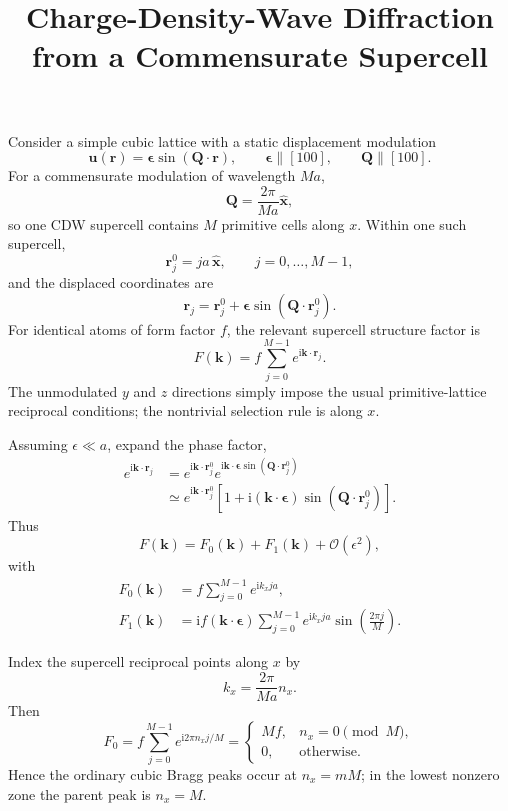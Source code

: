 \documentclass[11pt]{article}
\title{\vspace{-1.2cm}Charge-Density-Wave Diffraction from a Commensurate Supercell}
\author{}
\date{}
\newcommand{\e}{\epsilon}
\newcommand{\ii}{\mathrm{i}}
\newcommand{\bQ}{\mathbf{Q}}
\newcommand{\bk}{\mathbf{k}}
\newcommand{\br}{\mathbf{r}}
\newcommand{\bu}{\mathbf{u}}
\newcommand{\cO}{\mathcal{O}}
\begin{document}
\maketitle
\vspace{-0.9cm}

Consider a simple cubic lattice with a static displacement modulation
\begin{equation}
    \bu(\br)=\bm{\e}\sin(\bQ\cdot\br),
    \qquad
    \bm{\e}\parallel[100],
    \qquad
    \bQ\parallel[100].
\end{equation}
For a commensurate modulation of wavelength $Ma$,
\begin{equation}
    \bQ=\frac{2\pi}{Ma}\hat{\mathbf{x}},
\end{equation}
so one CDW supercell contains $M$ primitive cells along $x$.  Within one such supercell,
\begin{equation}
    \br_j^0=ja\,\hat{\mathbf{x}},\qquad j=0,\ldots,M-1,
\end{equation}
and the displaced coordinates are
\begin{equation}
    \br_j=\br_j^0+\bm{\e}\sin(\bQ\cdot\br_j^0).
\end{equation}
For identical atoms of form factor $f$, the relevant supercell structure factor is
\begin{equation}
    F(\bk)=f\sum_{j=0}^{M-1}e^{\ii\bk\cdot\br_j}.
    \label{eq:Fexact}
\end{equation}
The unmodulated $y$ and $z$ directions simply impose the usual primitive-lattice reciprocal conditions; the nontrivial selection rule is along $x$.

Assuming $\e\ll a$, expand the phase factor,
\begin{align}
 e^{\ii\bk\cdot\br_j}
 &=e^{\ii\bk\cdot\br_j^0}
   e^{\ii\bk\cdot\bm{\e}\sin(\bQ\cdot\br_j^0)}\\
 &\simeq e^{\ii\bk\cdot\br_j^0}
 \left[1+\ii(\bk\cdot\bm{\e})\sin(\bQ\cdot\br_j^0)\right].
\end{align}
Thus
\begin{equation}
    F(\bk)=F_0(\bk)+F_1(\bk)+\cO(\e^2),
\end{equation}
with
\begin{align}
F_0(\bk)
&=f\sum_{j=0}^{M-1}e^{\ii k_xja},\\
F_1(\bk)
&=\ii f(\bk\cdot\bm{\e})
  \sum_{j=0}^{M-1}e^{\ii k_xja}
  \sin\!\left(\frac{2\pi j}{M}\right).
\end{align}

Index the supercell reciprocal points along $x$ by
\begin{equation}
    k_x=\frac{2\pi}{Ma}n_x.
\end{equation}
Then
\begin{equation}
F_0=f\sum_{j=0}^{M-1}e^{\ii2\pi n_xj/M}
=
\begin{cases}
Mf,&n_x=0\pmod M,\\
0,&\text{otherwise}.
\end{cases}
\end{equation}
Hence the ordinary cubic Bragg peaks occur at $n_x=mM$; in the lowest nonzero zone the parent peak is $n_x=M$.
\end{document}
